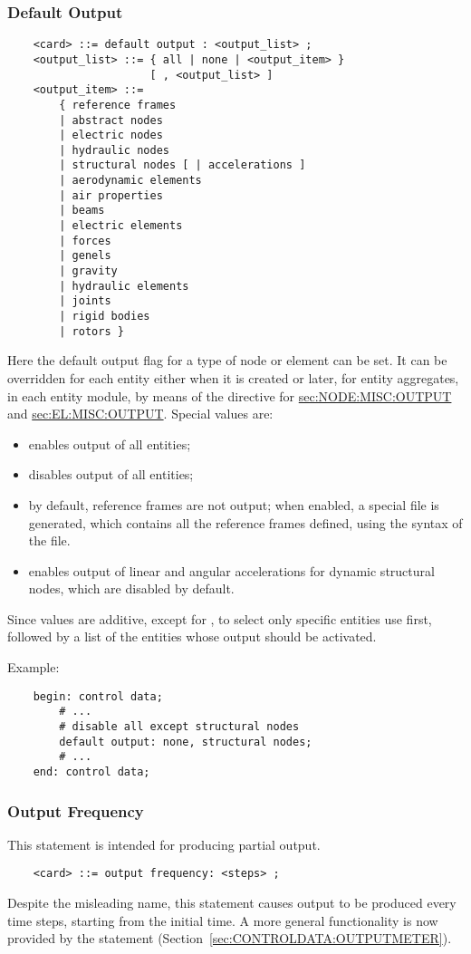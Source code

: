 \subsubsection{Default Output}\label{sec:CONTROLDATA:DEFAULTOUTPUT}
\begin{verbatim}
    <card> ::= default output : <output_list> ;
    <output_list> ::= { all | none | <output_item> } 
                      [ , <output_list> ]
    <output_item> ::=
        { reference frames
        | abstract nodes
        | electric nodes
        | hydraulic nodes
        | structural nodes [ | accelerations ]
        | aerodynamic elements
        | air properties
        | beams
        | electric elements
        | forces
        | genels
        | gravity
        | hydraulic elements
        | joints
        | rigid bodies
        | rotors }
\end{verbatim}
Here the default output flag for a type of node or element can be set.
It can be overridden for each entity either when it is created or later,
for entity aggregates, in each entity module, by means of the 
directive for 
\hyperref{\kw{nodes}}{\kw{nodes} (see Section~}{)}{sec:NODE:MISC:OUTPUT}
and 
\hyperref{\kw{elements}}{\kw{elements} (see Section~}{)}{sec:EL:MISC:OUTPUT}.
Special values are:
\begin{itemize}
\item {} enables output of all entities;
\item {} disables output of all entities;
\item {} by default, reference frames are not output;
when enabled, a special file  is generated, which contains
all the reference frames defined, using the syntax of the  file.
\item {} enables output of linear and angular accelerations
for dynamic structural nodes, which are disabled by default.
\end{itemize}
Since values are additive, except for , to select 
only specific entities use  first, followed by a list
of the entities whose output should be activated.

Example:
\begin{verbatim}
    begin: control data;
        # ...
        # disable all except structural nodes
        default output: none, structural nodes;
        # ...
    end: control data;
\end{verbatim}

\subsubsection{Output Frequency}
\label{sec:CONTROLDATA:OUTPUTFREQUENCY}
This statement is intended for producing partial output.
\begin{verbatim}
    <card> ::= output frequency: <steps> ;
\end{verbatim}
Despite the misleading name, this statement causes output to be produced
every  time steps, starting from the initial time.
A more general functionality is now provided by the 
statement (Section~\ref{sec:CONTROLDATA:OUTPUTMETER}).

